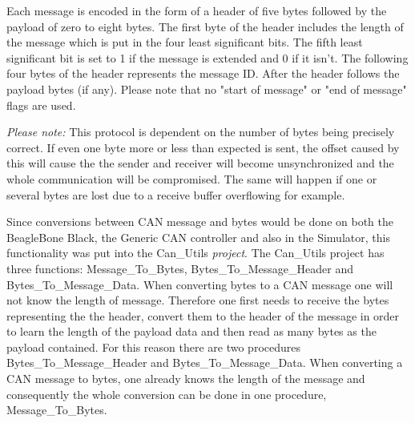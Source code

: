 Each message is encoded in the form of a header of five bytes followed by the payload of zero to eight bytes. The first byte of the header includes the length of the message which is put in the four least significant bits. The fifth least significant bit is set to 1 if the message is extended and 0 if it isn't. 
The following four bytes of the header represents the message ID. 
After the header follows the payload bytes (if any). \newline
Please note that no "start of message" or "end of message" flags are used.

\emph{Please note:} This protocol is dependent on the number of bytes being precisely correct. If even one byte more or less than expected is sent, the offset caused by this will cause the the sender and receiver will become unsynchronized and the whole communication will be compromised. The same will happen if one or several bytes are lost due to a receive buffer overflowing for example. \newline

Since conversions between CAN message and bytes would be done on both the BeagleBone Black, the Generic CAN controller and also in the Simulator, this functionality was put into the Can\_Utils \emph{project}. \newline
The Can\_Utils project has three functions: Message\_To\_Bytes, Bytes\_To\_Message\_Header and Bytes\_To\_Message\_Data.  \newline
When converting bytes to a CAN message one will not know the length of message. Therefore one first needs to receive the bytes representing the the header, convert them to the header of the message in order to learn the length of the payload data and then read as many bytes as the payload contained. \newline
For this reason there are two procedures Bytes\_To\_Message\_Header and Bytes\_To\_Message\_Data.  \newline
When converting a CAN message to bytes, one already knows the length of the message and consequently the whole conversion can be done in one procedure, Message\_To\_Bytes.

